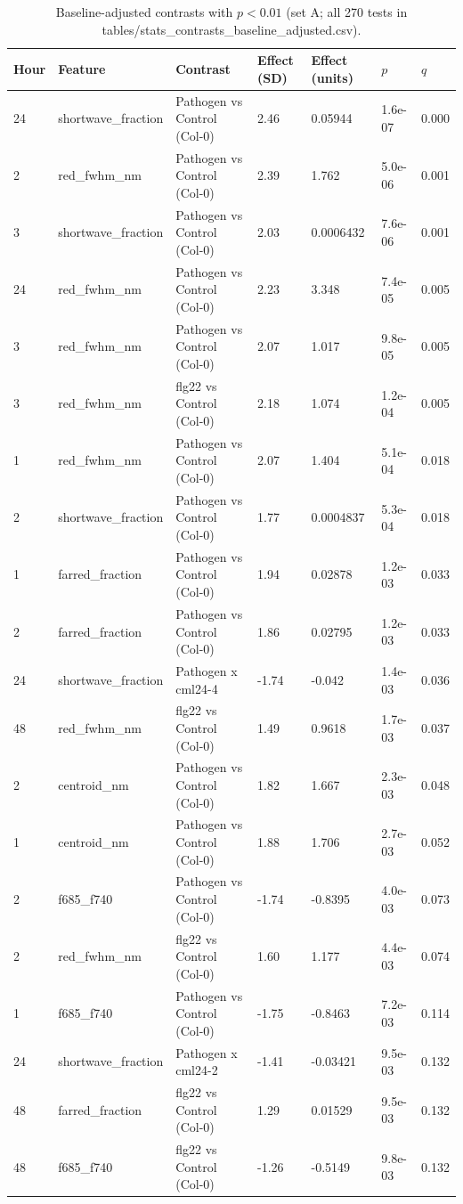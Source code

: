 \begin{table}[ht]\centering\small\setlength{\tabcolsep}{4pt}
\caption{Baseline-adjusted contrasts with $p<0.01$ (set A; all 270 tests in tables/stats\_contrasts\_baseline\_adjusted.csv).}\label{tab:baseline}
\begin{tabular}{lllllll}
\toprule
Hour & Feature & Contrast & Effect (SD) & Effect (units) & $p$ & $q$ \\
\midrule
24 & shortwave\_fraction & Pathogen vs Control (Col-0) & 2.46 & 0.05944 & 1.6e-07 & 0.000 \\
2 & red\_fwhm\_nm & Pathogen vs Control (Col-0) & 2.39 & 1.762 & 5.0e-06 & 0.001 \\
3 & shortwave\_fraction & Pathogen vs Control (Col-0) & 2.03 & 0.0006432 & 7.6e-06 & 0.001 \\
24 & red\_fwhm\_nm & Pathogen vs Control (Col-0) & 2.23 & 3.348 & 7.4e-05 & 0.005 \\
3 & red\_fwhm\_nm & Pathogen vs Control (Col-0) & 2.07 & 1.017 & 9.8e-05 & 0.005 \\
3 & red\_fwhm\_nm & flg22 vs Control (Col-0) & 2.18 & 1.074 & 1.2e-04 & 0.005 \\
1 & red\_fwhm\_nm & Pathogen vs Control (Col-0) & 2.07 & 1.404 & 5.1e-04 & 0.018 \\
2 & shortwave\_fraction & Pathogen vs Control (Col-0) & 1.77 & 0.0004837 & 5.3e-04 & 0.018 \\
1 & farred\_fraction & Pathogen vs Control (Col-0) & 1.94 & 0.02878 & 1.2e-03 & 0.033 \\
2 & farred\_fraction & Pathogen vs Control (Col-0) & 1.86 & 0.02795 & 1.2e-03 & 0.033 \\
24 & shortwave\_fraction & Pathogen x cml24-4 & -1.74 & -0.042 & 1.4e-03 & 0.036 \\
48 & red\_fwhm\_nm & flg22 vs Control (Col-0) & 1.49 & 0.9618 & 1.7e-03 & 0.037 \\
2 & centroid\_nm & Pathogen vs Control (Col-0) & 1.82 & 1.667 & 2.3e-03 & 0.048 \\
1 & centroid\_nm & Pathogen vs Control (Col-0) & 1.88 & 1.706 & 2.7e-03 & 0.052 \\
2 & f685\_f740 & Pathogen vs Control (Col-0) & -1.74 & -0.8395 & 4.0e-03 & 0.073 \\
2 & red\_fwhm\_nm & flg22 vs Control (Col-0) & 1.60 & 1.177 & 4.4e-03 & 0.074 \\
1 & f685\_f740 & Pathogen vs Control (Col-0) & -1.75 & -0.8463 & 7.2e-03 & 0.114 \\
24 & shortwave\_fraction & Pathogen x cml24-2 & -1.41 & -0.03421 & 9.5e-03 & 0.132 \\
48 & farred\_fraction & flg22 vs Control (Col-0) & 1.29 & 0.01529 & 9.5e-03 & 0.132 \\
48 & f685\_f740 & flg22 vs Control (Col-0) & -1.26 & -0.5149 & 9.8e-03 & 0.132 \\
\bottomrule
\end{tabular}
\end{table}
